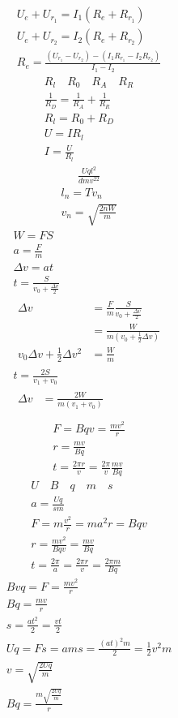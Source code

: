 \documentclass{article}
\newcommand\F[2]{\frac{#1}{#2}}
\begin{document}
  \begin{gather*}
    U_e + U_{r_1} = I_1(R_e + R_{r_1}) \\
    U_e + U_{r_2} = I_2(R_e + R_{r_2}) \\
    R_e = \frac{( U_{r_1} - U_{r_2} ) - ( I_1 R_{r_1} - I_2 R_{r_2} )}{I_1 - I_2}
  \end{gather*}
  \begin{gather*}
    R_l \quad R_0 \quad R_A \quad R_R \\
    \frac{1}{R_D} = \frac{1}{R_A} + \frac{1}{R_R} \\
    R_l = R_0 + R_D \\
    U = IR_l \\
    I = \frac{U}{R_l}
  \end{gather*}
  \begin{gather*}
    \frac{Uql^2}{dmv ^22}
  \end{gather*}
  \begin{gather*}
    l_{n} = Tv_{n} \\
    v_{n} = \sqrt{\frac{2nW}{m}}
  \end{gather*}
  \begin{gather*}
    W = FS \\
    a = \frac{F}{m} \\
    \Delta v = at \\
    t = \frac{S}{v_{0} + \frac{\Delta v}{2}} \\
    \begin{aligned}
      \Delta v &= \frac{F}{m} \frac{S}{v_{0} + \frac{\Delta v}{2}} \\
      &= \frac{W}{m(v_{0} + \frac{1}{2}\Delta v)} \\
      v_{0}\Delta v + \frac{1}{2}\Delta v^{2} &= \frac{W}{m}
    \end{aligned} \\
    t = \frac{2S}{v_{1} + v_{0}} \\
    \begin{aligned}
      \Delta v &= \frac{2W}{m(v_{1} + v_{0})} \\
    \end{aligned}
  \end{gather*}
  \begin{gather*}
    F = Bqv = \frac{mv^2}{r} \\
    r = \frac{mv}{Bq} \\
    t = \frac{2\pi r}{v} = \frac{2\pi}{v} \frac{mv}{Bq}
  \end{gather*}
  \begin{gather*}
    U \quad B \quad q \quad m \quad s \\
    a = \F{Uq}{sm} \\
    F = m\F{v^2}{r} = ma^2r = Bqv \\
    r = \F{mv^2}{Bqv} = \F{mv}{Bq} \\
    t = \F{2\pi}{a} = \F{2\pi r}{v} = \F{2\pi m}{Bq}
  \end{gather*}
  \begin{gather*}
    Bvq = F = \F{mv^2}{r} \\
    Bq = \F{mv}{r} \\
    s = \F{at^2}{2} = \F{vt}{2} \\
    Uq = Fs = ams = \F{(at)^2m}{2} = \F{1}{2}v^2m \\
    v = \sqrt{\F{2Uq}{m}} \\
    Bq = \F{m\sqrt{\F{2Uq}{m}}}{r}
  \end{gather*}
\end{document}
